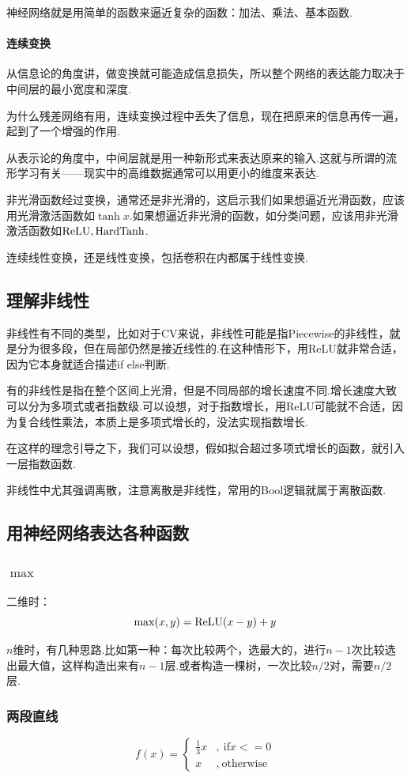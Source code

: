 神经网络就是用简单的函数来逼近复杂的函数：加法、乘法、基本函数.


\paragraph*{连续变换} 从信息论的角度讲，做变换就可能造成信息损失，所以整个网络的表达能力取决于中间层的最小宽度和深度.

为什么残差网络有用，连续变换过程中丢失了信息，现在把原来的信息再传一遍，起到了一个增强的作用.

从表示论的角度中，中间层就是用一种新形式来表达原来的输入.这就与所谓的流形学习有关——现实中的高维数据通常可以用更小的维度来表达.

非光滑函数经过变换，通常还是非光滑的，这启示我们如果想逼近光滑函数，应该用光滑激活函数如$\tanh x$.如果想逼近非光滑的函数，如分类问题，应该用非光滑激活函数如$\operatorname{ReLU},\operatorname{HardTanh}$.

连续线性变换，还是线性变换，包括卷积在内都属于线性变换.

\subsection{理解非线性}
非线性有不同的类型，比如对于CV来说，非线性可能是指Piecewise的非线性，就是分为很多段，但在局部仍然是接近线性的.在这种情形下，用ReLU就非常合适，因为它本身就适合描述if else判断.

有的非线性是指在整个区间上光滑，但是不同局部的增长速度不同.增长速度大致可以分为多项式或者指数级.可以设想，对于指数增长，用ReLU可能就不合适，因为复合线性乘法，本质上是多项式增长的，没法实现指数增长.

在这样的理念引导之下，我们可以设想，假如拟合超过多项式增长的函数，就引入一层指数函数.

非线性中尤其强调离散，注意离散是非线性，常用的Bool逻辑就属于离散函数.

\subsection{用神经网络表达各种函数}
\subsubsection{$\max$}
二维时：
$$\max (x,y)=\operatorname{ReLU} (x-y)+y$$

$n$维时，有几种思路.比如第一种：每次比较两个，选最大的，进行$n-1$次比较选出最大值，这样构造出来有$n-1$层.或者构造一棵树，一次比较$n/2$对，需要$n/2$层.

\subsubsection{两段直线}
\[
f(x)=\begin{cases}
	\frac{1}{3}x&,\ \text{if} x<=0 \\
	x&,\ \text{otherwise}
\end{cases}
\]

